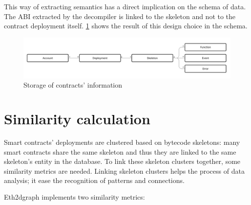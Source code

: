 This way of extracting semantics has a direct implication on the schema of data. The ABI extracted by the decompiler is linked to the skeleton and not to the contract deployment itself. \cref{fig:contracts-storage} shows the result of this design choice in the schema.

\begin{figure}[H]
  \centering
  \includegraphics[width=1\textwidth]{Figures/methods/contracts-storage.jpg}
  \caption[Storage of contracts' information]{Storage of contracts' information}
  \label{fig:contracts-storage}
\end{figure}

\section{Similarity calculation}
\label{similarity-calculation}
Smart contracts' deployments are clustered based on bytecode skeletons: many smart contracts share the same skeleton and thus they are linked to the same skeleton's entity in the database. To link these skeleton clusters together, some similarity metrics are needed. Linking skeleton clusters helps the process of data analysis; it ease the recognition of patterns and connections.

Eth2dgraph implements two similarity metrics:

